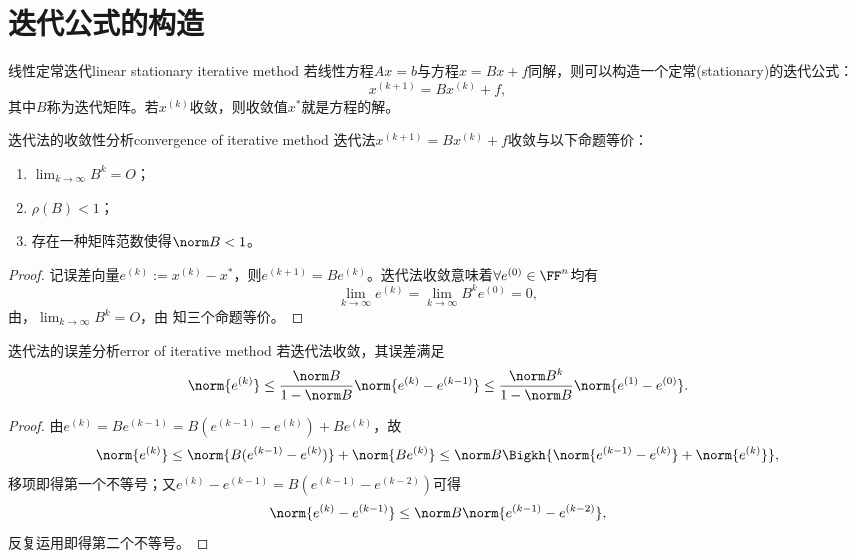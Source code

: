 \section{迭代公式的构造}

\begin{theorem}
    {线性定常迭代}{linear stationary iterative method}
    若线性方程$Ax=b$与方程$x=Bx+f$同解，则可以构造一个定常(stationary)的迭代公式：
    \begin{equation}
        x^{(k+1)}=Bx^{(k)}+f,
    \end{equation}
    其中$B$称为迭代矩阵。若$x^{(k)}$收敛，则收敛值$x^*$就是方程的解。
\end{theorem}

\begin{theorem}
    {迭代法的收敛性分析}{convergence of iterative method}
    迭代法$x^{(k+1)}=Bx^{(k)}+f$收敛与以下命题等价：
    \begin{enumerate}
        \item $\lim_{k\to\infty}B^k=O$；
        \item $\rho(B)<1$；
        \item 存在一种矩阵范数使得$\norm B<1$。
    \end{enumerate}
\end{theorem}

\begin{proof}
    记误差向量$e^{(k)}:=x^{(k)}-x^*$，则$e^{(k+1)}=Be^{(k)}$。迭代法收敛意味着$\forall e^{(0)}\in\FF^n$均有
    \[
        \lim_{k\to\infty}e^{(k)}=\lim_{k\to\infty}B^ke^{(0)}=0,
    \]
    由，$\lim_{k\to\infty}B^k=O$，由 知三个命题等价。
\end{proof}

\begin{theorem}
    {迭代法的误差分析}{error of iterative method}
    若迭代法收敛，其误差满足
    \begin{equation}
        \norm{e^{(k)}}\leq\frac{\norm B}{1-\norm B}\norm{e^{(k)}-e^{(k-1)}}\leq\frac{\norm B^k}{1-\norm B}\norm{e^{(1)}-e^{(0)}}.
    \end{equation}
\end{theorem}

\begin{proof}
    由$e^{(k)}=Be^{(k-1)}=B(e^{(k-1)}-e^{(k)})+Be^{(k)}$，故
    \[
        \norm{e^{(k)}}\leq\norm{B(e^{(k-1)}-e^{(k)})}+\norm{Be^{(k)}}\leq\norm B\Bigkh{\norm{e^{(k-1)}-e^{(k)}}+\norm{e^{(k)}}},
    \]
    移项即得第一个不等号；又$e^{(k)}-e^{(k-1)}=B(e^{(k-1)}-e^{(k-2)})$可得 
    \[
        \norm{e^{(k)}-e^{(k-1)}}\leq\norm B\norm{e^{(k-1)}-e^{(k-2)}},
    \]
    反复运用即得第二个不等号。
\end{proof}

